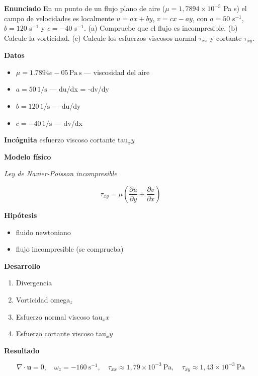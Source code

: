 \documentclass[10pt,openany]{book}
\begin{document}
\begin{tcolorbox}[title={Problema resuelto}, studiumworked, breakable]

\noindent\textbf{Enunciado}
En un punto de un flujo plano de aire (\(\mu = 1{,}7894\times 10^{-5}\) Pa s) el campo de velocidades es localmente \(u = ax + by\), \(v = cx - ay\), con \(a = 50\) s\(^{-1}\), \(b = 120\) s\(^{-1}\) y \(c = -40\) s\(^{-1}\). (a) Compruebe que el flujo es incompresible. (b) Calcule la vorticidad. (c) Calcule los esfuerzos viscosos normal \(\tau_{xx}\) y cortante \(\tau_{xy}\).

\noindent\textbf{Datos}
\begin{itemize}
\item $\mu = 1.7894e-05\,\mathrm{Pa}\,\mathrm{s}$ — viscosidad del aire
\item $a = 50\,\mathrm{1/s}$ — du/dx = -dv/dy
\item $b = 120\,\mathrm{1/s}$ — du/dy
\item $c = -40\,\mathrm{1/s}$ — dv/dx
\end{itemize}

\noindent\textbf{Incógnita}
esfuerzo viscoso cortante tau\(_xy\)

\noindent\textbf{Modelo físico}

\noindent\textit{Ley de Navier-Poisson incompresible}

\[
\tau_{xy} = \mu\left(\frac{\partial u}{\partial y} + \frac{\partial v}{\partial x}\right)
\]

\noindent\textbf{Hipótesis}
\begin{itemize}
\item fluido newtoniano
\item flujo incompresible (se comprueba)
\end{itemize}

\noindent\textbf{Desarrollo}
\begin{enumerate}
\item
Divergencia
\item
Vorticidad omega\(_z\)
\item
Esfuerzo normal viscoso tau\(_xx\)
\item
Esfuerzo cortante viscoso tau\(_xy\)
\end{enumerate}

\noindent\textbf{Resultado}

\[
\nabla\cdot\mathbf{u} = 0,\quad \omega_z = -160\ \mathrm{s^{-1}},\quad \tau_{xx} \approx 1{,}79\times 10^{-3}\ \mathrm{Pa},\quad \tau_{xy} \approx 1{,}43\times 10^{-3}\ \mathrm{Pa}
\]


\end{tcolorbox}
\end{document}
